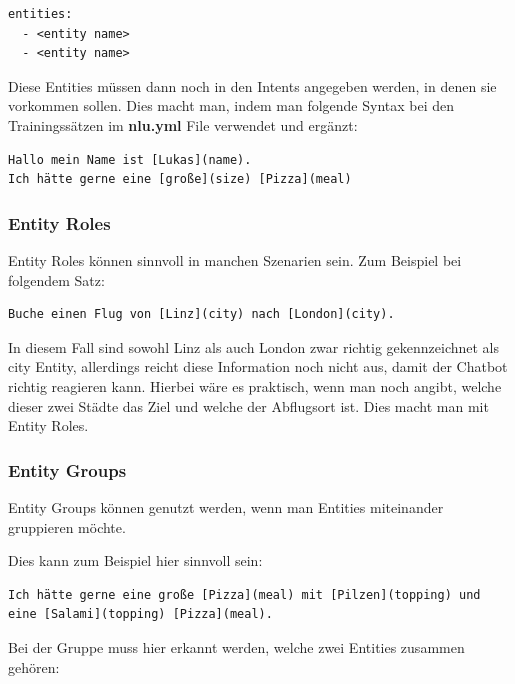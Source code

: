 \begin{lstlisting}[label={lst: Entities Domain Example}]
entities:
  - <entity name>
  - <entity name>
\end{lstlisting}

Diese Entities müssen dann noch in den Intents angegeben werden, in denen sie vorkommen sollen.
Dies macht man, indem man folgende Syntax bei den Trainingssätzen im \textbf{nlu.yml} File verwendet und ergänzt:

\begin{lstlisting}[label={lst: Entities NLU Example}]
Hallo mein Name ist [Lukas](name).
Ich hätte gerne eine [große](size) [Pizza](meal)
\end{lstlisting}

\subsubsection{Entity Roles}

Entity Roles können sinnvoll in manchen Szenarien sein.
Zum Beispiel bei folgendem Satz:

\begin{lstlisting}[label={lst: Entity Roles Example}]
Buche einen Flug von [Linz](city) nach [London](city).
\end{lstlisting}

In diesem Fall sind sowohl Linz als auch London zwar richtig gekennzeichnet als city Entity, allerdings reicht diese Information noch nicht aus, damit der Chatbot richtig reagieren kann.
Hierbei wäre es praktisch, wenn man noch angibt, welche dieser zwei Städte das Ziel und welche der Abflugsort ist.
Dies macht man mit Entity Roles.\cite{entityRolesGroups}

\subsubsection{Entity Groups}

Entity Groups können genutzt werden, wenn man Entities miteinander gruppieren möchte.\cite{entityRolesGroups}

Dies kann zum Beispiel hier sinnvoll sein:

\begin{lstlisting}[label={lst: Entity Groups Example 1}]
Ich hätte gerne eine große [Pizza](meal) mit [Pilzen](topping) und eine [Salami](topping) [Pizza](meal).
\end{lstlisting}

Bei der Gruppe muss hier erkannt werden, welche zwei Entities zusammen gehören\cite{entityRolesGroups}:

